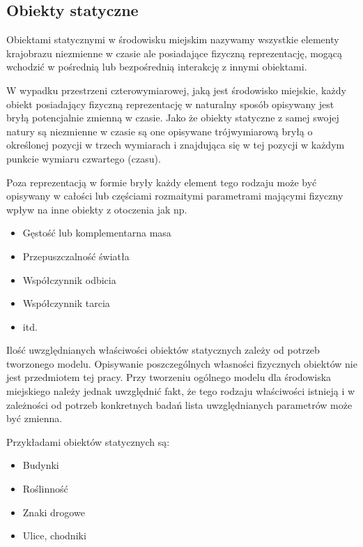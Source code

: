 {\subsection{Obiekty statyczne}
\par{
Obiektami statycznymi w środowisku miejskim nazywamy wszystkie elementy krajobrazu niezmienne w czasie ale posiadające fizyczną reprezentację, mogącą wchodzić w pośrednią lub bezpośrednią interakcję z innymi obiektami.
}
\par{
W wypadku przestrzeni czterowymiarowej, jaką jest środowisko miejskie, każdy obiekt posiadający fizyczną reprezentację w naturalny sposób opisywany jest bryłą potencjalnie zmienną w czasie. Jako że obiekty statyczne z samej swojej natury są niezmienne w czasie są one opisywane trójwymiarową bryłą o określonej pozycji w trzech wymiarach i znajdująca się w tej pozycji w każdym punkcie wymiaru czwartego (czasu).
}
\par{
Poza reprezentacją w formie bryły każdy element tego rodzaju może być opisywany w całości lub częściami rozmaitymi parametrami mającymi fizyczny wpływ na inne obiekty z otoczenia jak np.
\begin{itemize}
\item Gęstość lub komplementarna masa
\item Przepuszczalność światła
\item Współczynnik odbicia
\item Współczynnik tarcia
\item itd.
\end{itemize}
}
\par{
Ilość uwzględnianych właściwości obiektów statycznych zależy od potrzeb tworzonego modelu. Opisywanie poszczególnych własności fizycznych obiektów nie jest przedmiotem tej pracy. Przy tworzeniu ogólnego modelu dla środowiska miejskiego należy jednak uwzględnić fakt, że tego rodzaju właściwości istnieją i w zależności od potrzeb konkretnych badań lista uwzględnianych parametrów może być zmienna.
}
\par{
Przykładami obiektów statycznych są:
\begin{itemize}
\item Budynki
\item Roślinność
\item Znaki drogowe
\item Ulice, chodniki
\end{itemize}
}
}
